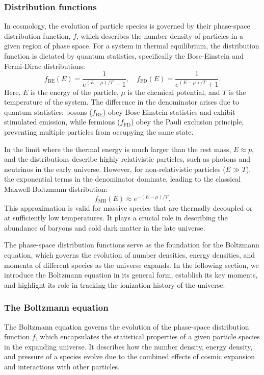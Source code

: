 \documentclass{aa}
\begin{document}
\subsubsection{Distribution functions}
\color{Plum}
In cosmology, the evolution of particle species is governed by their phase-space distribution function, $f$, which describes the number density of particles in a given region of phase space. For a system in thermal equilibrium, the distribution function is dictated by quantum statistics, specifically the Bose-Einstein and Fermi-Dirac distributions:
\begin{equation}
f_{\text{BE}}(E) = \frac{1}{e^{(E - \mu) / T} - 1}, \quad f_{\text{FD}}(E) = \frac{1}{e^{(E - \mu) / T} + 1}.
\end{equation}
Here, $E$ is the energy of the particle, $\mu$ is the chemical potential, and $T$ is the temperature of the system. The difference in the denominator arises due to quantum statistics: bosons ($f_{\text{BE}}$) obey Bose-Einstein statistics and exhibit stimulated emission, while fermions ($f_{\text{FD}}$) obey the Pauli exclusion principle, preventing multiple particles from occupying the same state.

In the limit where the thermal energy is much larger than the rest mass, $E \approx p$, and the distributions describe highly relativistic particles, such as photons and neutrinos in the early universe. However, for non-relativistic particles ($E \gg T$), the exponential terms in the denominator dominate, leading to the classical Maxwell-Boltzmann distribution:
\begin{equation}
f_{\text{MB}}(E) \approx e^{-(E - \mu) / T}.
\end{equation}
This approximation is valid for massive species that are thermally decoupled or at sufficiently low temperatures. It plays a crucial role in describing the abundance of baryons and cold dark matter in the late universe.

The phase-space distribution functions serve as the foundation for the Boltzmann equation, which governs the evolution of number densities, energy densities, and momenta of different species as the universe expands. In the following section, we introduce the Boltzmann equation in its general form, establish its key moments, and highlight its role in tracking the ionization history of the universe.
\color{black}








\subsubsection{The Boltzmann equation}
\color{Plum}
The Boltzmann equation governs the evolution of the phase-space distribution function $f$, which encapsulates the statistical properties of a given particle species in the expanding universe. It describes how the number density, energy density, and pressure of a species evolve due to the combined effects of cosmic expansion and interactions with other particles.
\end{document}
